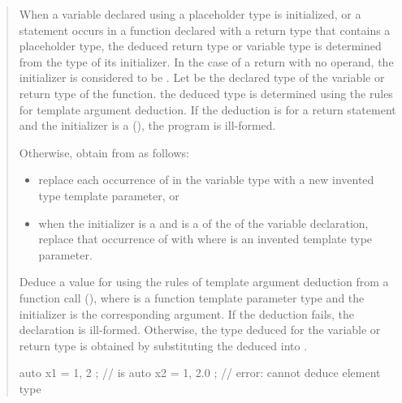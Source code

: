 \begin{quote}
\pnum
When a variable declared using a placeholder type is initialized, or a 
 statement occurs in a function declared with a return type 
that contains a placeholder type, the deduced return type or variable type 
is determined from the type of its initializer.
%
In the case of a return with no operand, the initializer is considered to 
be .
%
Let  be the declared type of the variable or return type of the 
function.
%
the deduced type is determined using the rules for template argument
deduction. 
%
If the deduction is for a return statement and the initializer is a 
 (), the program is
ill-formed. 
%

\begin{addedblock}
Otherwise, obtain  from  as follows:
\begin{itemize}
\item replace each occurrence of  in the
variable type with a new invented type template parameter,
or
\item when the initializer is a 
and  is a  of the 
 of the variable declaration, replace that 
occurrence of  with 
where  is an invented template type parameter.
\end{itemize}
\end{addedblock}
% 
Deduce a value for   using the rules of template argument deduction from 
a function call (), where  is a function 
template parameter type and the initializer is the corresponding argument.
%
If the deduction fails, the declaration is ill-formed. 
% 
Otherwise, the type deduced for the variable or return type is obtained by 
substituting the deduced   into .
% 
\enterexample
\begin{codeblock}
auto x1 = { 1, 2 };                 //   is 
auto x2 = { 1, 2.0 };               // error: cannot deduce element type
\end{codeblock}
\exitexample
\end{quote}

